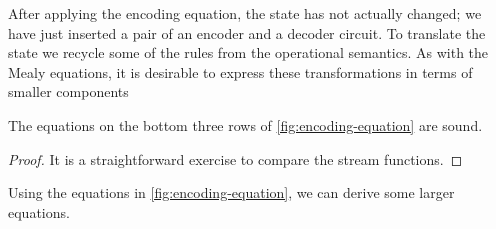 After applying the encoding equation, the state has not actually changed; we
have just inserted a pair of an encoder and a decoder circuit.
To translate the state we recycle some of the rules from the operational
semantics.
As with the Mealy equations, it is desirable to express these transformations in
terms of smaller components

\begin{lemma}
    The equations on the bottom three rows of \cref{fig:encoding-equation} are
    sound.
\end{lemma}
\begin{proof}
    It is a straightforward exercise to compare the stream functions.
\end{proof}

Using the equations in \cref{fig:encoding-equation}, we can derive some larger
equations.

